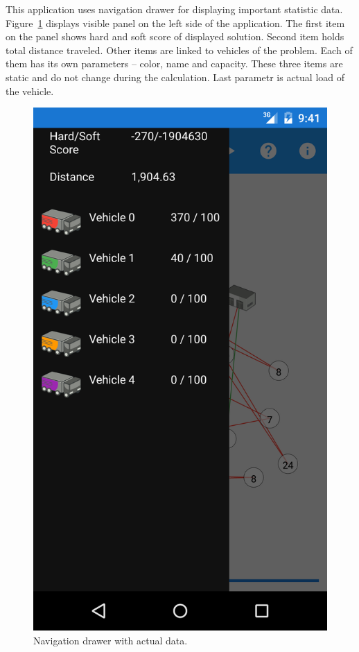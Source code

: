 This application uses navigation drawer for displaying important statistic data. Figure~\ref{NavigationDrawerFigure}
displays visible panel on the left side of the application. The first item on the panel shows hard and soft score of
displayed solution. Second item holds total distance traveled. Other items are linked to vehicles of the problem. Each
of them has its own parameters -- color, name and capacity. These three items are static and do not change during the
calculation. Last parametr is actual load of the vehicle.
\\
\begin{figure}[h!]
    \centering
    \includegraphics[scale=0.15]{fig/nav_drawer.png}
    \caption{Navigation drawer with actual data.}
    \label{NavigationDrawerFigure}
\end{figure}

